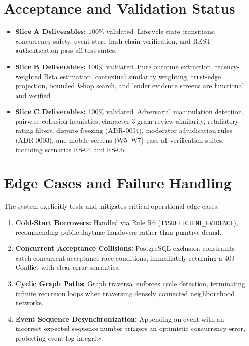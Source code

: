\section{Acceptance and Validation Status}
\begin{itemize}
    \item \textbf{Slice A Deliverables:} 100\% validated. Lifecycle state transitions, concurrency safety, event store hash-chain verification, and REST authentication pass all test suites.
    \item \textbf{Slice B Deliverables:} 100\% validated. Pure outcome extraction, recency-weighted Beta estimation, contextual similarity weighting, trust-edge projection, bounded $k$-hop search, and lender evidence screens are functional and verified.
    \item \textbf{Slice C Deliverables:} 100\% validated. Adversarial manipulation detection, pairwise collusion heuristics, character 3-gram review similarity, retaliatory rating filters, dispute freezing (ADR-0004), moderator adjudication rules (ADR-0003), and mobile screens (W5--W7) pass all verification suites, including scenarios ES-04 and ES-05.
\end{itemize}

\section{Edge Cases and Failure Handling}
The system explicitly tests and mitigates critical operational edge cases:
\begin{enumerate}
    \item \textbf{Cold-Start Borrowers:} Handled via Rule R6 (\texttt{INSUFFICIENT\_EVIDENCE}), recommending public daytime handovers rather than punitive denial.
    \item \textbf{Concurrent Acceptance Collisions:} PostgreSQL exclusion constraints catch concurrent acceptance race conditions, immediately returning a 409 Conflict with clear error semantics.
    \item \textbf{Cyclic Graph Paths:} Graph traversal enforces cycle detection, terminating infinite recursion loops when traversing densely connected neighbourhood networks.
    \item \textbf{Event Sequence Desynchronization:} Appending an event with an incorrect expected sequence number triggers an optimistic concurrency error, protecting event log integrity.
\end{enumerate}

